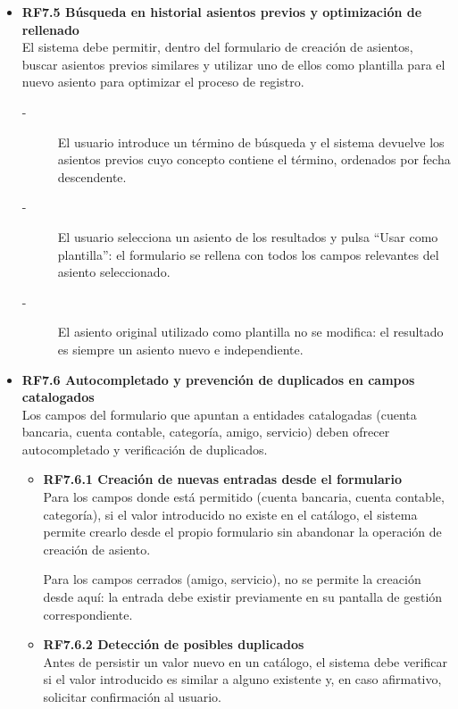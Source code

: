 \begin{itemize}
    \item \textbf{RF7.5 Búsqueda en historial asientos previos y optimización de rellenado} \\
    El sistema debe permitir, dentro del formulario de creación de
    asientos, buscar asientos previos similares y utilizar uno de ellos
    como plantilla para el nuevo asiento para optimizar el proceso de registro.
    \begin{description}
        \item[-] El usuario introduce un término de búsqueda y el sistema devuelve los asientos previos cuyo concepto contiene el
        término, ordenados por fecha descendente.
        \item[-] El usuario selecciona un asiento de los resultados y pulsa ``Usar
        como plantilla'': el formulario se rellena con todos los campos relevantes del asiento seleccionado.
        \item[-] El asiento original utilizado como plantilla no se modifica: el resultado es siempre un asiento nuevo e independiente.
    \end{description}


    \item \textbf{RF7.6 Autocompletado y prevención de duplicados en campos catalogados} \\
    Los campos del formulario que apuntan a entidades catalogadas (cuenta
    bancaria, cuenta contable, categoría, amigo, servicio) deben ofrecer
    autocompletado y verificación de duplicados.
    \begin{itemize}
        \item \textbf{RF7.6.1 Creación de nuevas entradas desde el formulario} \\
        Para los campos donde está permitido (cuenta bancaria, cuenta
        contable, categoría), si el valor introducido no existe en el
        catálogo, el sistema permite crearlo desde el propio formulario sin
        abandonar la operación de creación de asiento.
        \par
        Para los campos cerrados (amigo, servicio), no se permite la
        creación desde aquí: la entrada debe existir previamente en su
        pantalla de gestión correspondiente.
        \item \textbf{RF7.6.2 Detección de posibles duplicados} \\
        Antes de persistir un valor nuevo en un catálogo, el sistema debe
        verificar si el valor introducido es similar a alguno existente y,
        en caso afirmativo, solicitar confirmación al usuario.
    \end{itemize}
    


\end{itemize}
